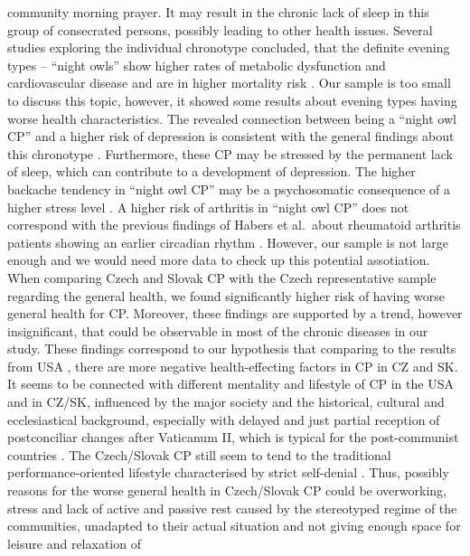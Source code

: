 \documentclass[ijerph,article,accept,moreauthors,pdftex]{mdpi}
\begin{document}
community morning prayer. It may result in the chronic lack of sleep in
this group of consecrated persons, possibly leading to other health
issues. Several studies exploring the individual chronotype concluded,
that the definite evening types -- ``night owls'' show higher rates of
metabolic dysfunction and cardiovascular disease and are in higher
mortality risk \citep{knutson2018associations}. Our sample is too small
to discuss this topic, however, it showed some results about evening
types having worse health characteristics. The revealed connection
between being a ``night owl CP'' and a higher risk of depression is
consistent with the general findings about this chronotype
\citep{facer2019resetting}. Furthermore, these CP may be stressed by the
permanent lack of sleep, which can contribute to a development of
depression. The higher backache tendency in ``night owl CP'' may be a
psychosomatic consequence of a higher stress level
\citep{hajnovic2018causal}. A higher risk of arthritis in ``night owl
CP'' does not correspond with the previous findings of Habers et
al.~about rheumatoid arthritis patients showing an earlier circadian
rhythm \citep{habers2021earlier}. However, our sample is not large
enough and we would need more data to check up this potential
assotiation. When comparing Czech and Slovak CP with the Czech
representative sample regarding the general health, we found
significantly higher risk of having worse general health for CP.
Moreover, these findings are supported by a trend, however
insignificant, that could be observable in most of the chronic diseases
in our study. These findings correspond to our hypothesis that comparing
to the results from USA
\citep{schott2019stability, weinstein2019autonomous}, there are more
negative health-effecting factors in CP in CZ and SK. It seems to be
connected with different mentality and lifestyle of CP in the USA and in
CZ/SK, influenced by the major society and the historical, cultural and
ecclesiastical background, especially with delayed and just partial
reception of postconciliar changes after Vaticanum II, which is typical
for the post-communist countries
\citep{fiala2000koncil, balik2012letnice}. The Czech/Slovak CP still
seem to tend to the traditional performance-oriented lifestyle
characterised by strict self-denial \citep{petravcek2013sekularizace}.
Thus, possibly reasons for the worse general health in Czech/Slovak CP
could be overworking, stress and lack of active and passive rest caused
by the stereotyped regime of the communities, unadapted to their actual
situation and not giving enough space for leisure and relaxation of
\end{document}
